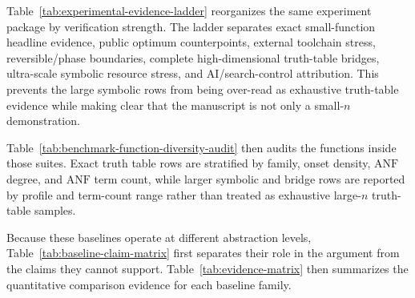 \documentclass[11pt]{article}
\newcommand{\anf}{\ensuremath{\mathrm{ANF}}}
\newcommand{\ttable}{truth table}
\begin{document}
\begin{table}[H]
\centering
\tiny
\setlength{\tabcolsep}{2pt}
\renewcommand{\arraystretch}{0.94}
\caption{Benchmark-suite composition audit.  Each row reports the role,
variable range, item count, raw row count, checked row count, verification
route, and residual representativeness boundary for one benchmark family.}
\label{tab:benchmark-suite-audit}

\end{table}

Table~\ref{tab:experimental-evidence-ladder} reorganizes the same experiment
package by verification strength.  The ladder separates exact small-function
headline evidence, public optimum counterpoints, external toolchain stress,
reversible/phase boundaries, complete high-dimensional truth-table bridges,
ultra-scale symbolic resource stress, and AI/search-control attribution.  This
prevents the large symbolic rows from being over-read as exhaustive
truth-table evidence while making clear that the manuscript is not only a
small-$n$ demonstration.

\begin{table}[H]
\centering
\tiny
\setlength{\tabcolsep}{2pt}
\renewcommand{\arraystretch}{0.94}
\caption{Experimental evidence ladder.  Each row states the verification
strength, resource dimensions, claim use, and boundary for one experimental
layer, from exact same-task rows through symbolic ultra-scale stress and
learned-control attribution.}
\label{tab:experimental-evidence-ladder}

\end{table}

Table~\ref{tab:benchmark-function-diversity-audit} then audits the functions
inside those suites.  Exact \ttable{} rows are stratified by family, onset
density, \anf{} degree, and \anf{} term count, while larger symbolic and bridge
rows are reported by profile and term-count range rather than treated as
exhaustive large-$n$ truth-table samples.

\begin{table}[H]
\centering
\tiny
\setlength{\tabcolsep}{2pt}
\renewcommand{\arraystretch}{0.94}
\caption{Benchmark function-diversity audit.  Exact small rows report family,
density, degree, and \anf{} term-count coverage; large symbolic/bridge rows
report profile and term-count coverage.}
\label{tab:benchmark-function-diversity-audit}

\end{table}

Because these baselines operate at different abstraction levels,
Table~\ref{tab:baseline-claim-matrix} first separates their role in the
argument from the claims they cannot support.  Table~\ref{tab:evidence-matrix}
then summarizes the quantitative comparison evidence for each baseline family.
\end{document}
